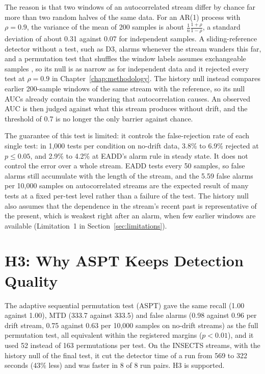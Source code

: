 The reason is that two windows of an autocorrelated stream differ by chance far more than two random halves of the same data. For an AR(1) process with $\rho = 0.9$, the variance of the mean of 200 samples is about $\frac{1}{n}\frac{1+\rho}{1-\rho}$, a standard deviation of about 0.31 against 0.07 for independent samples. A sliding-reference detector without a test, such as D3, alarms whenever the stream wanders this far, and a permutation test that shuffles the window labels assumes exchangeable samples \citep{Good2005}, so its null is as narrow as for independent data and it rejected every test at $\rho = 0.9$ in Chapter~\ref{chap:methodology}. The history null instead compares earlier 200-sample windows of the same stream with the reference, so its null AUCs already contain the wandering that autocorrelation causes. An observed AUC is then judged against what this stream produces without drift, and the threshold of 0.7 is no longer the only barrier against chance.

The guarantee of this test is limited: it controls the false-rejection rate of each single test: in 1,000 tests per condition on no-drift data, 3.8\% to 6.9\% rejected at $p \le 0.05$, and 2.9\% to 4.2\% at EADD's alarm rule in steady state. It does not control the error over a whole stream. EADD tests every 50 samples, so false alarms still accumulate with the length of the stream, and the 5.59 false alarms per 10,000 samples on autocorrelated streams are the expected result of many tests at a fixed per-test level rather than a failure of the test. The history null also assumes that the dependence in the stream's recent past is representative of the present, which is weakest right after an alarm, when few earlier windows are available (Limitation~1 in Section~\ref{sec:limitations}).

\section{H3: Why ASPT Keeps Detection Quality}
\label{sec:disc-h3}

The adaptive sequential permutation test (ASPT) gave the same recall (1.00 against 1.00), MTD (333.7 against 333.5) and false alarms (0.98 against 0.96 per drift stream, 0.75 against 0.63 per 10,000 samples on no-drift streams) as the full permutation test, all equivalent within the registered margins ($p < 0.01$), and it used 52 instead of 163 permutations per test. On the INSECTS streams, with the history null of the final test, it cut the detector time of a run from 569 to 322 seconds (43\% less) and was faster in 8 of 8 run pairs. H3 is supported.

